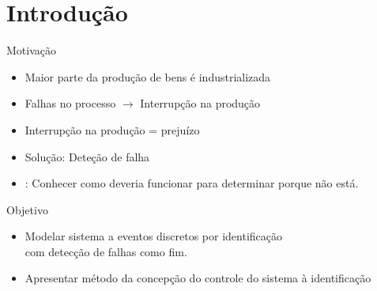 
\section{Introdução}


\begin{frame}{Motivação}
\begin{itemize}
\item Maior parte da produção de bens é industrializada \pause
\item Falhas no processo $\rightarrow$ Interrupção na produção \pause
\item Interrupção na produção = prejuízo \pause 
\item Solução: Deteção de falha \pause
\item \citep{davis1988model}: Conhecer como deveria funcionar para determinar
  porque não está.
\end{itemize}
\end{frame}

\begin{frame}{Objetivo}
\begin{itemize}
\item Modelar sistema a eventos discretos por identificação \\com detecção de falhas como fim.
  \pause
\item Apresentar método da concepção do controle do sistema à identificação 
\end{itemize}
\end{frame}


